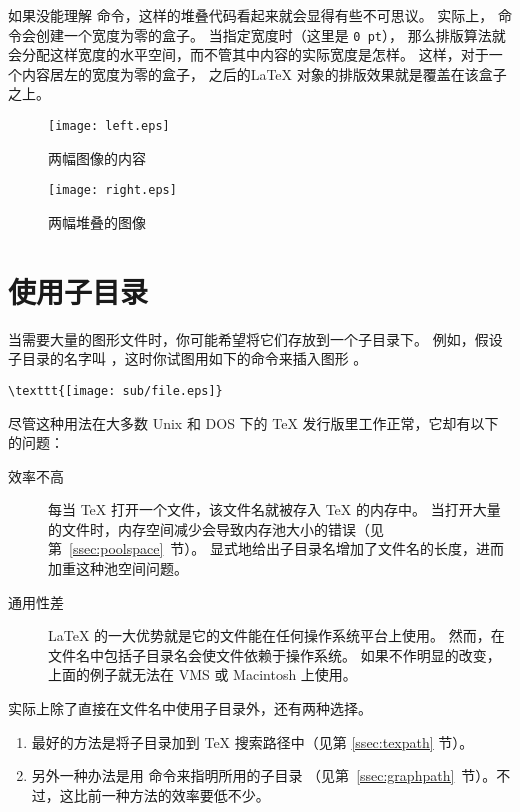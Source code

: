 如果没能理解  命令，这样的堆叠代码看起来就会显得有些不可思议。
实际上， 命令会创建一个宽度为零的盒子。
当指定宽度时（这里是 \texttt{0 pt}），
那么排版算法就会分配这样宽度的水平空间，而不管其中内容的实际宽度是怎样。
这样，对于一个内容居左的宽度为零的盒子，
之后的\LaTeX{} 对象的排版效果就是覆盖在该盒子之上。

\begin{figure}
	\centering
	\texttt{[image: left.eps]}
	\caption{两幅图像的内容}\label{fig:leftright}
\end{figure}
\begin{figure}
	\centering
	\texttt{[image: right.eps]}
	\caption{两幅堆叠的图像}\label{fig:leftrightoverlay}
\end{figure}

\section{使用子目录}\label{sec:subdir}

当需要大量的图形文件时，你可能希望将它们存放到一个子目录下。
例如，假设子目录的名字叫 ，这时你试图用如下的命令来插入图形 。
\begin{lstlisting}
\texttt{[image: sub/file.eps]}
\end{lstlisting}

尽管这种用法在大多数 Unix 和 DOS 下的 \TeX{} 发行版里工作正常，它却有以下的问题：
\begin{description}
	\item [效率不高]
	
	每当 \TeX{} 打开一个文件，该文件名就被存入 TeX{} 的内存中。
	当打开大量的文件时，内存空间减少会导致内存池大小的错误（见第~\ref{ssec:poolspace}~节）。
	显式地给出子目录名增加了文件名的长度，进而加重这种池空间问题。
	
	\item [通用性差]
	
	\LaTeX{} 的一大优势就是它的文件能在任何操作系统平台上使用。
	然而，在文件名中包括子目录名会使文件依赖于操作系统。
	如果不作明显的改变，上面的例子就无法在 VMS 或 Macintosh 上使用。
\end{description}
实际上除了直接在文件名中使用子目录外，还有两种选择。
\begin{enumerate}
	\item 最好的方法是将子目录加到 \TeX{} 搜索路径中（见第 \ref{ssec:texpath} 节）。
	\item 另外一种办法是用  命令来指明所用的子目录
	（见第~\ref{ssec:graphpath}~节）。不过，这比前一种方法的效率要低不少。
\end{enumerate}

